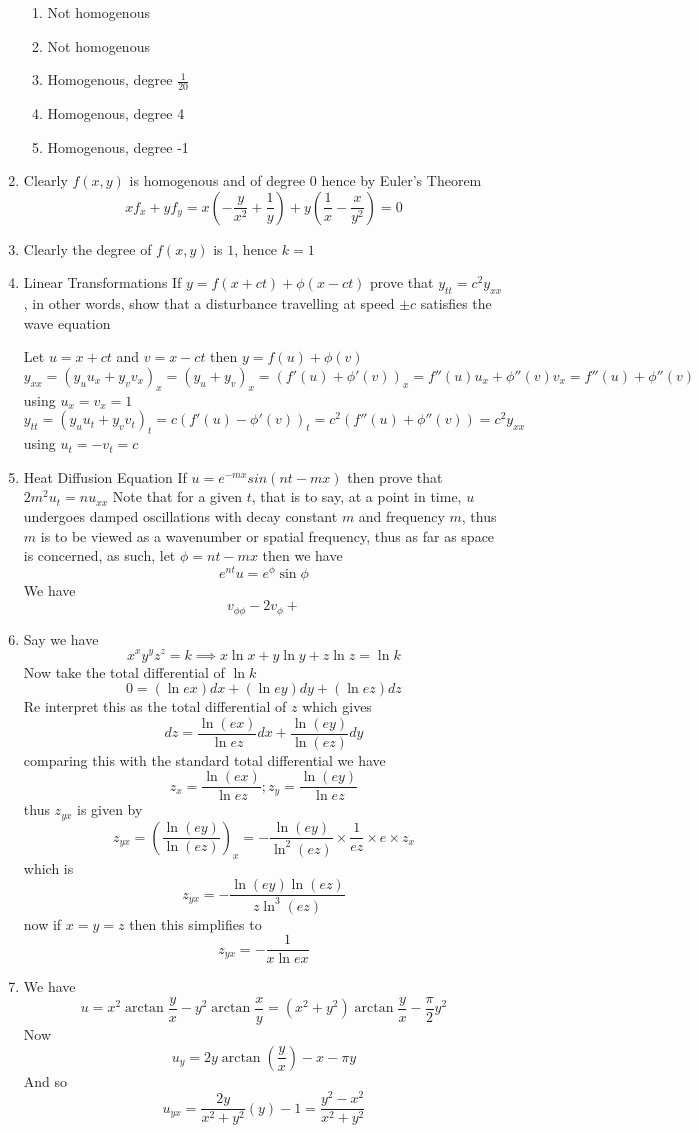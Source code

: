\documentclass[12pt]{article}
\begin{document}
\begin{enumerate}
\begin{enumerate}
\item Not homogenous
\item Not homogenous
\item Homogenous, degree $\frac{1}{20}$
\item Homogenous, degree 4
\item Homogenous, degree -1
\end{enumerate}
\item 
Clearly $f(x,y)$ is homogenous and of degree $0$ hence by Euler's Theorem
$$
xf_{x} + yf_{y} = x\left( -\frac{y}{x^{2}} + \frac{1}{y} \right) + y\left( \frac{1}{x}-\frac{x}{y^{2}} \right) = 0
$$
\item
Clearly the degree of $f(x,y)$ is $1$, hence $k=1$
\item Linear Transformations
If $y = f(x + ct) + \phi(x-ct)$ prove that $y_{tt} = c^{2} y_{xx}$, in other words, show that a disturbance travelling at speed $\pm c$ satisfies the wave equation

Let $u = x + ct$ and $v=x-ct$ then $y = f(u) + \phi(v)$
$$
y_{x x} = (y_{u}u_{x} + y_{v}v_{x})_{x}= (y_{u} + y_{v})_{x} = (f'(u)+\phi'(v))_{x} = f''(u)u_{x} + \phi''(v)v_{x} = f''(u) + \phi''(v)
$$
using $u_{x}=v_{x}=1$
$$
\boxed{
y_{tt} = (y_{u}u_{t} + y_{v}v_{t})_{t} = c(f'(u) - \phi'(v))_{t} = c^{2}(f''(u)+\phi''(v)) = c^{2}y_{xx}
}
$$
using $u_{t} = -v_{t} = c$
\item Heat Diffusion Equation
If $u = e^{ -mx }sin(nt-mx)$ then prove that $2m^{2}u_{t} = n u_{xx}$
Note that for a given $t$, that is to say, at a point in time, $u$ undergoes damped oscillations with decay constant $m$ and frequency $m$, thus $m$ is to be viewed as a wavenumber or spatial frequency, thus as far as space is concerned, as such, let $\phi = nt-mx$ then we have
$$
e^{ nt }u = e^{ \phi }\sin \phi
$$
We have
$$
v_{\phi \phi} -2v_{\phi} + 
$$

\item
Say we have
$$
x^{x}  y^{y} z^{z} = k \implies x\ln x + y\ln y + z \ln z = \ln k
$$
Now take the total differential of $\ln k$
$$
0 = (\ln ex)dx + (\ln ey)dy + (\ln ez)dz
$$
Re interpret this as the total differential of $z$ which gives
$$
dz = \frac{\ln(ex)}{\ln ez}dx + \frac{\ln (ey)}{\ln(ez)}dy
$$
comparing this with the standard total differential we have
$$
z_{x} = \frac{\ln(ex)}{\ln ez}; z_{y}= \frac{\ln(ey)}{\ln ez}
$$
thus $z_{yx}$ is given by
$$
z_{yx} = \left( \frac{\ln(ey)}{\ln(ez)} \right)_{x} = -\frac{\ln(ey)}{\ln ^{2}(ez)} \times\frac{1}{ez}\times e\times z_{x}
$$
which is
$$
z_{yx} = -\frac{\ln(ey)\ln (ez) }{z\ln ^{3}(ez)}
$$
now if $x=y=z$ then this simplifies to
$$
\boxed{
z_{yx} = -\frac{1}{x\ln ex}
}
$$
\item
We have
$$
u = x^{2} \arctan \frac{y}{x} -y^{2} \arctan \frac{x}{y} = (x^{2} + y^{2})\arctan \frac{y}{x} -\frac{\pi}{2}y^{2}
$$
Now 
$$
u_{y} = 2y\arctan\left( \frac{y}{x} \right) -x - \pi y
$$
And so
$$
\boxed{
u_{yx} = \frac{2y}{x^{2} +y^{2}}(y) - 1 = \frac{y^{2}-x^{2}}{x^{2} + y^{2}}
}
$$


\end{enumerate}
\end{document}
